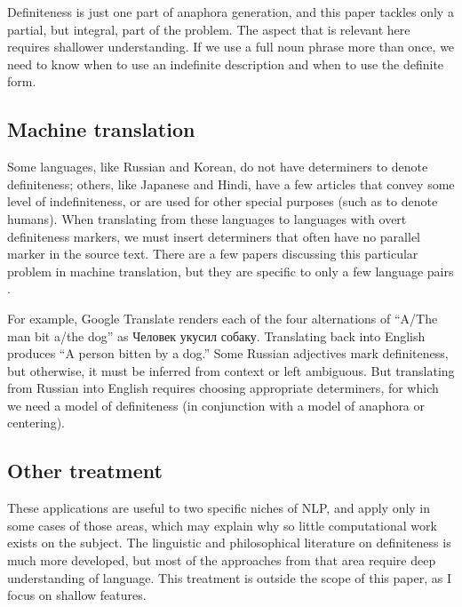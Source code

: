 \documentclass[11pt]{article}\usepackage{graphicx, color}
\begin{document}
Definiteness is just one part of anaphora generation, and this paper tackles only a partial, but integral, part of the problem. The aspect that is relevant here requires shallower understanding. If we use a full noun phrase more than once, we need to know when to use an indefinite description and when to use the definite form.



\subsection{Machine translation}

Some languages, like Russian and Korean, do not have determiners to denote definiteness; others, like Japanese and Hindi, have a few articles that convey some level of indefiniteness, or are used for other special purposes (such as to denote humans). %
When translating from these languages to languages with overt definiteness markers, we must insert determiners that often have no parallel marker in the source text.
There are a few papers discussing this particular problem in machine translation, but they are specific to only a few language pairs \citep{ishikawa:1995, siegel:1996}.

For example, Google Translate renders each of the four alternations of ``A/The man bit a/the dog'' as \foreignlanguage{russian}{Человек укусил собаку.} Translating back into English produces ``A person bitten by a dog.'' Some Russian adjectives mark definiteness, but otherwise, it must be inferred from context or left ambiguous. But translating from Russian into English requires choosing appropriate determiners, for which we need a model of definiteness (in conjunction with a model of anaphora or centering).

\subsection{Other treatment}
These applications are useful to two specific niches of NLP, and apply only in some cases of those areas,
which may explain why so little computational work exists on the subject.
The linguistic and philosophical literature on definiteness is much more developed, but most of the approaches from that area require deep understanding of language. This treatment is outside the scope of this paper, as I focus on shallow features.
\end{document}
